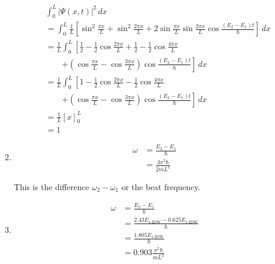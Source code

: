\documentclass{article}
\begin{document}
\begin{enumerate}
        \begin{align*}
           & \int_0^L |\Psi(x, t)|^2 \,dx                                                                                                                                                  \\
           & = \int_0^L \frac{1}{L} \left[ \sin^2 \frac{\pi x}{L} + \sin^2 \frac{2 \pi x}{L} + 2 \sin \frac{\pi x}{L} \sin \frac{2 \pi x}{L} \cos \frac{(E_2 - E_1) t}{\hbar} \right] \,dx \\
           & = \frac{1}{L} \int_0^L \left[ \frac{1}{2} - \frac{1}{2} \cos \frac{2 \pi x}{L} + \frac{1}{2} - \frac{1}{2} \cos \frac{4 \pi x}{L} \right.                                     \\
           & \qquad \left. + \left( \cos \frac{\pi x}{L} - \cos \frac{3 \pi x}{L} \right) \cos \frac{(E_2 - E_1) t}{\hbar} \right] \,dx                                                    \\
           & = \frac{1}{L} \int_0^L \left[ 1 - \frac{1}{2} \cos \frac{2 \pi x}{L} - \frac{1}{2} \cos \frac{4 \pi x}{L} \right.                                                             \\
           & \qquad \left. + \left( \cos \frac{\pi x}{L} - \cos \frac{3 \pi x}{L} \right) \cos \frac{(E_2 - E_1) t}{\hbar} \right] \,dx                                                    \\
           & = \frac{1}{L} [x]_0^L                                                                                                                                                         \\
           & = 1
        \end{align*}

  \item

        \begin{align*}
          \omega & = \frac{E_2 - E_1}{\hbar}       \\
                 & = \frac{3 \pi^2 \hbar}{2 m L^2}
        \end{align*}

        This is the difference $\omega_2 - \omega_1$ or the beat frequency.

  \item

        \begin{align*}
          \omega & = \frac{E_2 - E_1}{\hbar}                                  \\
                 & = \frac{2.43 E_\text{1-IDW} - 0.625 E_\text{1-IDW}}{\hbar} \\
                 & = \frac{1.805 E_\text{1-IDW}}{\hbar}                       \\
                 & = 0.903 \frac{\pi^2 \hbar}{m L^2}
        \end{align*}
\end{enumerate}
\end{document}
